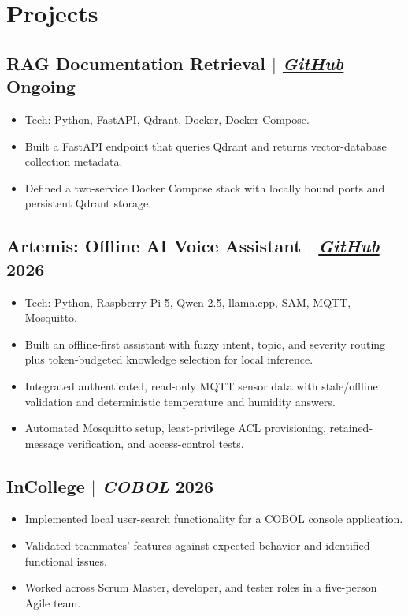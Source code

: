 \documentclass[11pt]{article}
\begin{document}
\section{Projects}
\subsection{RAG Documentation Retrieval $|$ {\normalfont\textit{\href{https://github.com/Ace0I0/RAG-Documentation-Retrieval}{GitHub}}} \hfill Ongoing}
\begin{itemize}
    \item Tech: Python, FastAPI, Qdrant, Docker, Docker Compose.
    \item Built a FastAPI endpoint that queries Qdrant and returns vector-database collection metadata.
    \item Defined a two-service Docker Compose stack with locally bound ports and persistent Qdrant storage.
\end{itemize}

\subsection{Artemis: Offline AI Voice Assistant $|$ {\normalfont\textit{\href{https://github.com/Ace0I0/Local_LM_testing/tree/project-testing}{GitHub}}} \hfill 2026}
\begin{itemize}
    \item Tech: Python, Raspberry Pi 5, Qwen 2.5, llama.cpp, SAM, MQTT, Mosquitto.
    \item Built an offline-first assistant with fuzzy intent, topic, and severity routing plus token-budgeted knowledge selection for local inference.
    \item Integrated authenticated, read-only MQTT sensor data with stale/offline validation and deterministic temperature and humidity answers.
    \item Automated Mosquitto setup, least-privilege ACL provisioning, retained-message verification, and access-control tests.
\end{itemize}

\subsection{InCollege $|$ {\normalfont\textit{COBOL}} \hfill 2026}
\begin{itemize}
    \item Implemented local user-search functionality for a COBOL console application.
    \item Validated teammates' features against expected behavior and identified functional issues.
    \item Worked across Scrum Master, developer, and tester roles in a five-person Agile team.
\end{itemize}
\end{document}
